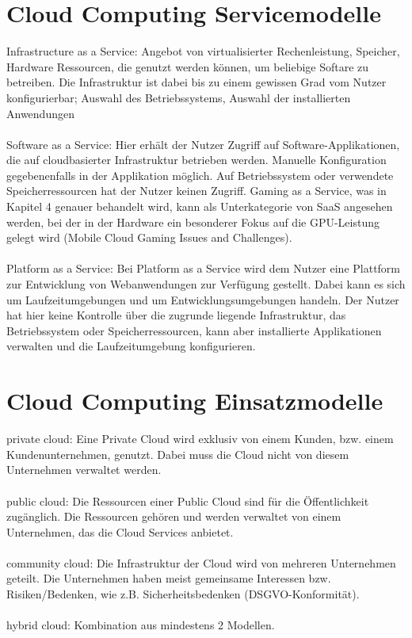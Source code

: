 \documentclass[12pt,toc=bib,toc=listof]{scrreprt}
\begin{document}
\section{Cloud Computing Servicemodelle} %
\label{sec:Cloud Computing Servicemodelle}

Infrastructure as a Service: Angebot von virtualisierter Rechenleistung, Speicher, Hardware Ressourcen, die genutzt werden können, um beliebige Softare zu betreiben.
Die Infrastruktur ist dabei bis zu einem gewissen Grad vom Nutzer konfigurierbar; Auswahl des Betriebssystems, Auswahl der installierten Anwendungen
\\ \\
Software as a Service: Hier erhält der Nutzer Zugriff auf Software-Applikationen, die auf cloudbasierter Infrastruktur betrieben werden.
Manuelle Konfiguration gegebenenfalls in der Applikation möglich. Auf Betriebssystem oder verwendete Speicherressourcen hat der Nutzer keinen Zugriff. 
Gaming as a Service, was in Kapitel 4 genauer behandelt wird, kann als Unterkategorie von SaaS angesehen werden, bei der in der Hardware ein besonderer Fokus auf die 
GPU-Leistung gelegt wird (Mobile Cloud Gaming Issues and Challenges).
\\ \\
Platform as a Service: Bei Platform as a Service wird dem Nutzer eine Plattform zur Entwicklung von Webanwendungen zur Verfügung gestellt. Dabei kann es sich 
um Laufzeitumgebungen und um Entwicklungsumgebungen handeln. Der Nutzer hat hier keine Kontrolle über die zugrunde liegende Infrastruktur, 
das Betriebssystem oder Speicherressourcen, kann aber installierte Applikationen verwalten und die Laufzeitumgebung konfigurieren.

\section{Cloud Computing Einsatzmodelle} %
\label{sec:Cloud Computing Einsatzmodelle}

private cloud: Eine Private Cloud wird exklusiv von einem Kunden, bzw. einem Kundenunternehmen, genutzt.
 Dabei muss die Cloud nicht von diesem Unternehmen verwaltet werden.
 \\ \\
public cloud: Die Ressourcen einer Public Cloud sind für die Öffentlichkeit zugänglich.
 Die Ressourcen gehören und werden verwaltet von einem Unternehmen, das die Cloud Services anbietet.
 \\ \\ 
community cloud: Die Infrastruktur der Cloud wird von mehreren Unternehmen geteilt.
 Die Unternehmen haben meist gemeinsame Interessen bzw. Risiken/Bedenken, wie z.B. Sicherheitsbedenken
  (DSGVO-Konformität).  
\\ \\  
hybrid cloud: Kombination aus mindestens 2 Modellen.
\end{document}
